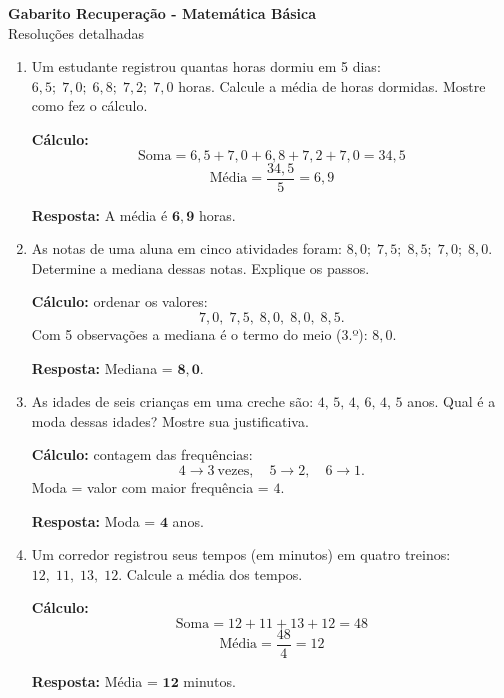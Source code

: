 \documentclass[11pt]{article}
\begin{document}
\begin{center}
    {\LARGE \textbf{Gabarito Recuperação - Matemática Básica}}\\[6pt]
    {\large Resoluções detalhadas}
\end{center}

\bigskip

\begin{enumerate}

\item Um estudante registrou quantas horas dormiu em 5 dias: $6{,}5;\;7{,}0;\;6{,}8;\;7{,}2;\;7{,}0$ horas.  
Calcule a média de horas dormidas. Mostre como fez o cálculo.

\textbf{Cálculo:}
\[
\text{Soma} = 6{,}5 + 7{,}0 + 6{,}8 + 7{,}2 + 7{,}0 = 34{,}5
\]
\[
\text{Média} = \frac{34{,}5}{5} = 6{,}9
\]

\textbf{Resposta:} A média é \(\mathbf{6{,}9}\) horas.

\bigskip

\item As notas de uma aluna em cinco atividades foram: $8{,}0;\;7{,}5;\;8{,}5;\;7{,}0;\;8{,}0$.  
Determine a mediana dessas notas. Explique os passos.

\textbf{Cálculo:} ordenar os valores:
\[
7{,}0,\;7{,}5,\;8{,}0,\;8{,}0,\;8{,}5.
\]
Com 5 observações a mediana é o termo do meio (3.º): \(8{,}0\).

\textbf{Resposta:} Mediana = \(\mathbf{8{,}0}\).

\bigskip

\item As idades de seis crianças em uma creche são: $4,\,5,\,4,\,6,\,4,\,5$ anos.  
Qual é a moda dessas idades? Mostre sua justificativa.

\textbf{Cálculo:} contagem das frequências:
\[
4 \to 3\ \text{vezes},\quad 5 \to 2,\quad 6 \to 1.
\]
Moda = valor com maior frequência = \(4\).

\textbf{Resposta:} Moda = \(\mathbf{4}\) anos.

\bigskip

\item Um corredor registrou seus tempos (em minutos) em quatro treinos: $12,\;11,\;13,\;12$.  
Calcule a média dos tempos.

\textbf{Cálculo:}
\[
\text{Soma} = 12 + 11 + 13 + 12 = 48
\]
\[
\text{Média} = \frac{48}{4} = 12
\]

\textbf{Resposta:} Média = \(\mathbf{12}\) minutos.

\bigskip


\end{enumerate}
\end{document}
